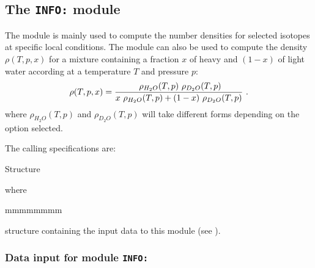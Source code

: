 \subsection{The {\tt INFO:} module}\label{sect:INFOData}

The  module is mainly used to compute the number densities for
selected isotopes at specific local conditions. The module can also be used to
compute the density $\rho(T,p,x)$ for a mixture containing a fraction $x$ of heavy and $(1-x)$ of light water according at a temperature $T$ and pressure $p$:
  $$
\rho(T,p,x) = {{\ \rho_{H_2O}(T,p)\ \rho_{D_2O}(T,p)}
\over{ x\ \rho_{H_2O}(T,p) +  (1-x) \ \rho_{D_2O}(T,p)}}\ .
  $$
where $\rho_{H_2O}(T,p)$ and $\rho_{D_2O}(T,p)$ will take different forms depending on the option selected.\cite{Kieffer}

\vskip 0.2cm

The calling specifications are:

\begin{DataStructure}{Structure }
 \moc{::} 
\end{DataStructure}

\goodbreak
\noindent where
\begin{ListeDeDescription}{mmmmmmmm}

\item[\dstr{descinfo}] structure containing the input data to this module
(see ).

\end{ListeDeDescription}

\vskip 0.2cm

\subsubsection{Data input for module {\tt INFO:}}\label{sect:descinfo}

